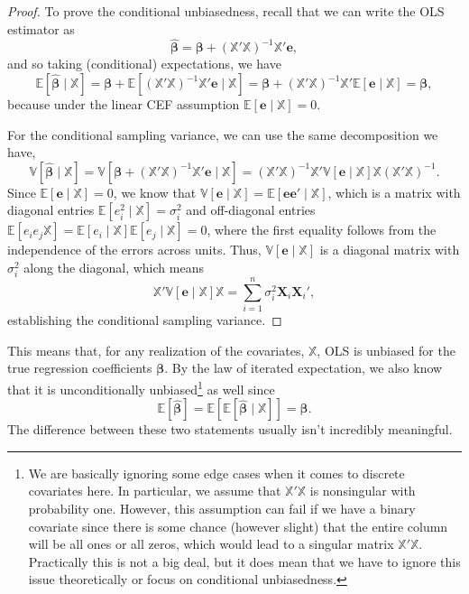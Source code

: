 \documentclass[
  letterpaper,
  DIV=11,
  numbers=noendperiod]{scrreprt}
\newcommand{\mb}{\symbf}
\newcommand{\E}{\mathbb{E}}
\newcommand{\V}{\mathbb{V}}
\newcommand{\X}{\mb{X}}
\newcommand{\Xmat}{\mathbb{X}}
\newcommand{\bfbeta}{\mb{\beta}}
\newcommand{\bhat}{\widehat{\mb{\beta}}}
\theoremstyle{plain}
\theoremstyle{definition}
\theoremstyle{definition}
\theoremstyle{remark}
\begin{document}
\begin{proof}

To prove the conditional unbiasedness, recall that we can write the OLS
estimator as \[
\bhat = \bfbeta + (\Xmat'\Xmat)^{-1}\Xmat'\mb{e},
\] and so taking (conditional) expectations, we have \[
\E[\bhat \mid \Xmat] = \bfbeta + \E[(\Xmat'\Xmat)^{-1}\Xmat'\mb{e} \mid \Xmat] = \bfbeta + (\Xmat'\Xmat)^{-1}\Xmat'\E[\mb{e} \mid \Xmat] = \bfbeta,
\] because under the linear CEF assumption \(\E[\mb{e}\mid \Xmat] = 0\).

For the conditional sampling variance, we can use the same decomposition
we have, \[
\V[\bhat \mid \Xmat] = \V[\bfbeta + (\Xmat'\Xmat)^{-1}\Xmat'\mb{e} \mid \Xmat] = (\Xmat'\Xmat)^{-1}\Xmat'\V[\mb{e} \mid \Xmat]\Xmat(\Xmat'\Xmat)^{-1}. 
\] Since \(\E[\mb{e}\mid \Xmat] = 0\), we know that
\(\V[\mb{e}\mid \Xmat] = \E[\mb{ee}' \mid \Xmat]\), which is a matrix
with diagonal entries \(\E[e_{i}^{2} \mid \Xmat] = \sigma^2_i\) and
off-diagonal entries
\(\E[e_{i}e_{j} \Xmat] = \E[e_{i}\mid \Xmat]\E[e_{j}\mid\Xmat] = 0\),
where the first equality follows from the independence of the errors
across units. Thus, \(\V[\mb{e} \mid \Xmat]\) is a diagonal matrix with
\(\sigma^2_i\) along the diagonal, which means \[
\Xmat'\V[\mb{e} \mid \Xmat]\Xmat = \sum_{i=1}^n \sigma^2_i \X_i\X_i',
\] establishing the conditional sampling variance.

\end{proof}

This means that, for any realization of the covariates, \(\Xmat\), OLS
is unbiased for the true regression coefficients \(\bfbeta\). By the law
of iterated expectation, we also know that it is unconditionally
unbiased\footnote{We are basically ignoring some edge cases when it
  comes to discrete covariates here. In particular, we assume that
  \(\Xmat'\Xmat\) is nonsingular with probability one. However, this
  assumption can fail if we have a binary covariate since there is some
  chance (however slight) that the entire column will be all ones or all
  zeros, which would lead to a singular matrix \(\Xmat'\Xmat\).
  Practically this is not a big deal, but it does mean that we have to
  ignore this issue theoretically or focus on conditional unbiasedness.}
as well since \[
\E[\bhat] = \E[\E[\bhat \mid \Xmat]] = \bfbeta. 
\] The difference between these two statements usually isn't incredibly
meaningful.
\end{document}
